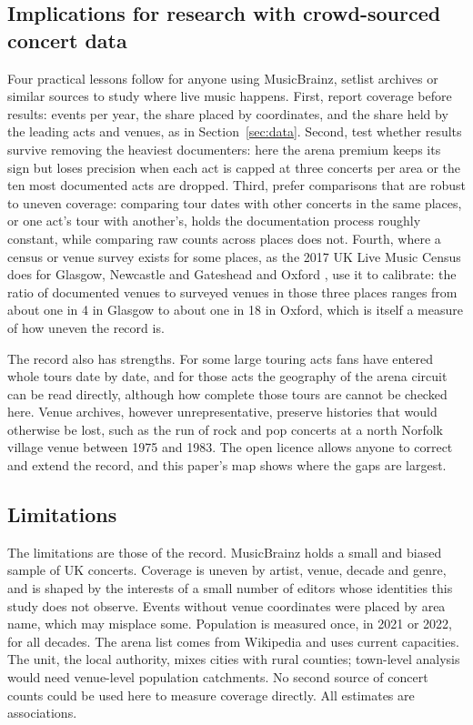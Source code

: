 \documentclass[11pt,a4paper]{article}
\begin{document}
\subsection{Implications for research with crowd-sourced concert data}
Four practical lessons follow for anyone using MusicBrainz, setlist archives or similar sources to study where live music happens. First, report coverage before results: events per year, the share placed by coordinates, and the share held by the leading acts and venues, as in Section~\ref{sec:data}. Second, test whether results survive removing the heaviest documenters: here the arena premium keeps its sign but loses precision when each act is capped at three concerts per area or the ten most documented acts are dropped. Third, prefer comparisons that are robust to uneven coverage: comparing tour dates with other concerts in the same places, or one act's tour with another's, holds the documentation process roughly constant, while comparing raw counts across places does not. Fourth, where a census or venue survey exists for some places, as the 2017 UK Live Music Census does for Glasgow, Newcastle and Gateshead and Oxford \citep{webster2018}, use it to calibrate: the ratio of documented venues to surveyed venues in those three places ranges from about one in 4 in Glasgow to about one in 18 in Oxford, which is itself a measure of how uneven the record is.

The record also has strengths. For some large touring acts fans have entered whole tours date by date, and for those acts the geography of the arena circuit can be read directly, although how complete those tours are cannot be checked here. Venue archives, however unrepresentative, preserve histories that would otherwise be lost, such as the run of rock and pop concerts at a north Norfolk village venue between 1975 and 1983. The open licence allows anyone to correct and extend the record, and this paper's map shows where the gaps are largest.

\subsection{Limitations}
The limitations are those of the record. MusicBrainz holds a small and biased sample of UK concerts. Coverage is uneven by artist, venue, decade and genre, and is shaped by the interests of a small number of editors whose identities this study does not observe. Events without venue coordinates were placed by area name, which may misplace some. Population is measured once, in 2021 or 2022, for all decades. The arena list comes from Wikipedia and uses current capacities. The unit, the local authority, mixes cities with rural counties; town-level analysis would need venue-level population catchments. No second source of concert counts could be used here to measure coverage directly. All estimates are associations.
\end{document}
